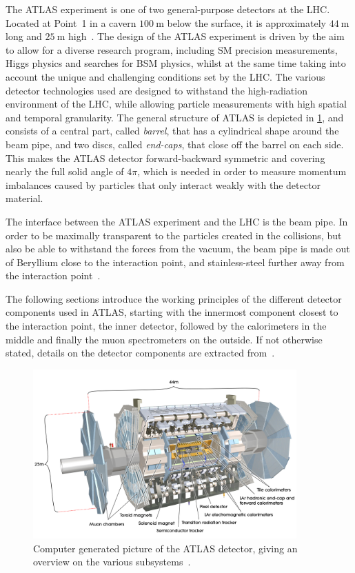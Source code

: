 The ATLAS experiment is one of two general-purpose detectors at the LHC. Located at Point~1 in a cavern $\SI{100}{\meter}$ below the surface, it is approximately $\SI{44}{\meter}$ long and $\SI{25}{\meter}$ high~\cite{Aad:2008zzm}. The design of the ATLAS experiment is driven by the aim to allow for a diverse research program, including SM precision measurements, Higgs physics and searches for BSM physics, whilst at the same time taking into account the unique and challenging conditions set by the LHC. The various detector technologies used are designed to withstand the high-radiation environment of the LHC, while allowing particle measurements with high spatial and temporal granularity. The general structure of ATLAS is depicted in \cref{fig:atlas_detector}, and consists of a central part, called \textit{barrel}, that has a cylindrical shape around the beam pipe, and two discs, called \textit{end-caps}, that close off the barrel on each side. This makes the ATLAS detector forward-backward symmetric and covering nearly the full solid angle of $4\pi$, which is needed in order to measure momentum imbalances caused by particles that only interact weakly with the detector material.

The interface between the ATLAS experiment and the LHC is the beam pipe. In order to be maximally transparent to the particles created in the collisions, but also be able to withstand the forces from the vacuum, the beam pipe is made out of Beryllium close to the interaction point, and stainless-steel further away from the interaction point~\cite{Brock:1354959}.

The following sections introduce the working principles of the different detector components used in ATLAS, starting with the innermost component closest to the interaction point, the inner detector, followed by the calorimeters in the middle and finally the muon spectrometers on the outside. If not otherwise stated, details on the detector components are extracted from~\cite{Aad:2008zzm}.

\begin{figure}
	\centering    
	\includegraphics[width=0.9\textwidth]{atlas}
	\caption[The ATLAS detector]{Computer generated picture of the ATLAS detector, giving an overview on the various subsystems~\cite{Pequenao:1095924}.}
	\label{fig:atlas_detector}
\end{figure}


